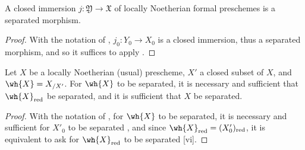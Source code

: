 \begin{proposition}[10.15.6]
\label{1.10.15.6}
A closed immersion $j:\mathfrak{Y}\to\mathfrak{X}$ of locally Noetherian formal preschemes is a separated morphism.
\end{proposition}

\begin{proof}
\label{proof-1.10.15.6}
With the notation of , $j_0:Y_0\to X_0$ is a closed immersion, thus a separated morphism, and so it suffices to apply .
\end{proof}

\begin{proposition}[10.15.7]
\label{1.10.15.7}
Let $X$ be a locally Noetherian (usual) prescheme, $X'$ a closed subset of $X$, and $\wh{X}=X_{/X'}$.
For $\wh{X}$ to be separated, it is necessary and sufficient that $\wh{X}_\red$ be separated, and it is sufficient that $X$ be separated.
\end{proposition}

\begin{proof}
\label{proof-1.10.15.7}
With the notation of , for $\wh{X}$ to be separated, it is necessary and sufficient for $X'_0$ to be separated , and since $\wh{X}_\red=(X'_0)_\red$, it is equivalent to ask for $\wh{X}_\red$ to be separated [vi].
\end{proof}
